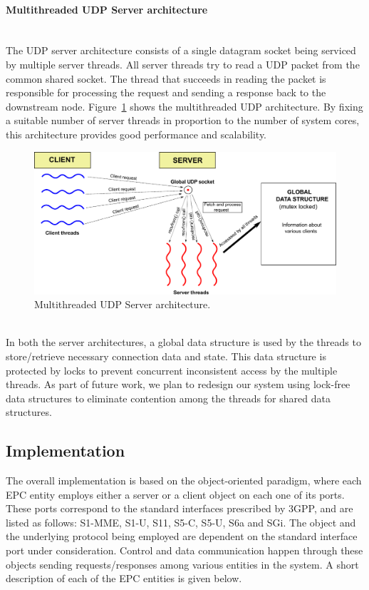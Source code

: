 \documentclass[hidelinks]{report}
\begin{document}
\paragraph*{Multithreaded UDP Server architecture}

~\\ The UDP server architecture consists of a single datagram socket being serviced by multiple server threads. All server threads try to read a UDP packet from the common shared socket. The thread that succeeds in reading the packet is responsible for processing the request and sending a response back to the downstream node. Figure~\ref{udp_arc} shows the multithreaded UDP architecture. By fixing a suitable number of server threads in proportion to the number of system cores, this architecture provides good performance and scalability. 

\begin{figure}[h]

\centering
\includegraphics[scale=0.5]{udp_arc}
\caption{Multithreaded UDP Server architecture.}
\label{udp_arc}

\end{figure}

~\\
In both the server architectures, a global data structure is used by the threads to store/retrieve necessary connection data and state. This data structure is protected by locks to prevent concurrent inconsistent access by the multiple threads. As part of future work, we plan to redesign our system using lock-free data structures to eliminate contention among the threads for shared data structures.

\subsection*{Implementation}

The overall implementation is based on the object-oriented paradigm, where each EPC entity employs either a server or a client object on each one of its ports. These ports correspond to the standard interfaces prescribed by 3GPP, and are listed as follows: S1-MME, S1-U, S11, S5-C, S5-U, S6a and SGi. The object and the underlying protocol being employed are dependent on the standard interface port under consideration. Control and data communication happen through these objects sending requests/responses among various entities in the system. A short description of each of the EPC entities is given below.
\end{document}
